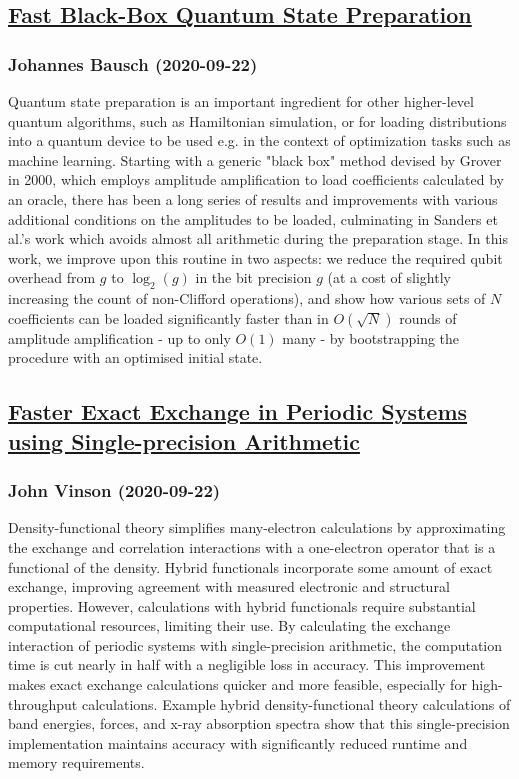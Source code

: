 {\subsection*{\href{http://arxiv.org/abs/2009.10709v1}{Fast Black-Box Quantum State Preparation}}
\subsubsection*{Johannes Bausch (2020-09-22)}
Quantum state preparation is an important ingredient for other higher-level
quantum algorithms, such as Hamiltonian simulation, or for loading
distributions into a quantum device to be used e.g. in the context of
optimization tasks such as machine learning. Starting with a generic "black
box" method devised by Grover in 2000, which employs amplitude amplification to
load coefficients calculated by an oracle, there has been a long series of
results and improvements with various additional conditions on the amplitudes
to be loaded, culminating in Sanders et al.'s work which avoids almost all
arithmetic during the preparation stage. In this work, we improve upon this
routine in two aspects: we reduce the required qubit overhead from $g$ to
$\log_2(g)$ in the bit precision $g$ (at a cost of slightly increasing the
count of non-Clifford operations), and show how various sets of $N$
coefficients can be loaded significantly faster than in $O(\sqrt N)$ rounds of
amplitude amplification - up to only $O(1)$ many - by bootstrapping the
procedure with an optimised initial state.

\subsection*{\href{http://arxiv.org/abs/2009.10705v1}{Faster Exact Exchange in Periodic Systems using Single-precision  Arithmetic}}
\subsubsection*{John Vinson (2020-09-22)}
Density-functional theory simplifies many-electron calculations by
approximating the exchange and correlation interactions with a one-electron
operator that is a functional of the density. Hybrid functionals incorporate
some amount of exact exchange, improving agreement with measured electronic and
structural properties. However, calculations with hybrid functionals require
substantial computational resources, limiting their use. By calculating the
exchange interaction of periodic systems with single-precision arithmetic, the
computation time is cut nearly in half with a negligible loss in accuracy. This
improvement makes exact exchange calculations quicker and more feasible,
especially for high-throughput calculations. Example hybrid density-functional
theory calculations of band energies, forces, and x-ray absorption spectra show
that this single-precision implementation maintains accuracy with significantly
reduced runtime and memory requirements.

}
